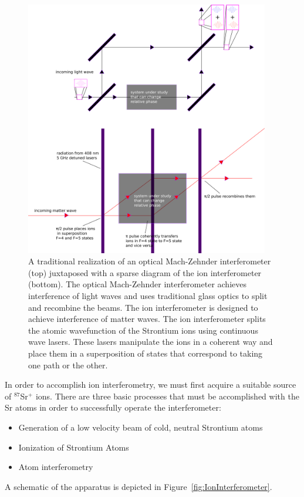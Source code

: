 \begin{figure}
\centerline{
\includegraphics[width=0.95\textwidth]{mach-zehnder}}
\caption[Optical and Matterwave Mach-Zehnder interferometers]{\label{mach-zehnder-fig}A traditional realization of an optical Mach-Zehnder interferometer (top) juxtaposed with a sparse diagram of the ion interferometer (bottom). The optical Mach-Zehnder interferometer achieves interference of light waves and uses traditional glass optics to split and recombine the beams. The ion interferometer is designed to achieve interference of matter waves. The ion interferometer splits the atomic wavefunction of the Strontium ions using continuous wave lasers. These lasers manipulate the ions in a coherent way and place them in a superposition of states that correspond to taking one path or the other.}
\end{figure}

In order to accomplish ion interferometry, we must first acquire a suitable source of $^{87}$Sr$^+$ ions. There are three basic processes that must be accomplished with the Sr atoms in order to successfully operate the interferometer: 
\begin{itemize}
\item Generation of a low velocity beam of cold, neutral Strontium atoms   
\item Ionization of Strontium Atoms
\item Atom interferometry
\end{itemize} 
A schematic of the apparatus is depicted in Figure~\ref{fig:IonInterferometer}.

